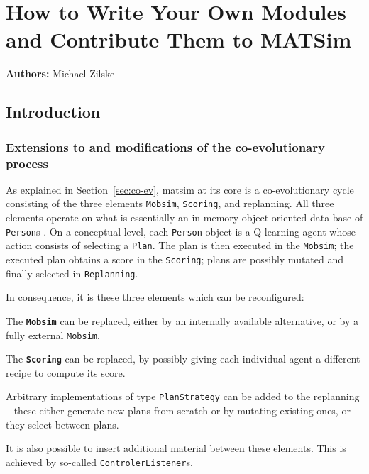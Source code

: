 \chapter{How to Write Your Own Modules and Contribute Them to MATSim}
\label{ch:extensionpoints}
\hfill \textbf{Authors:} Michael Zilske

\section{Introduction}
\label{sec:ownmodules-intro}

\subsection{Extensions to and modifications of the co-evolutionary process}

As explained in Section~\ref{sec:co-ev}, \acrshort{matsim} at its core is a co-evolutionary cycle consisting of the three elements \lstinline$Mobsim$, \lstinline$Scoring$, and replanning.  All three elements operate on what is essentially an in-memory object-oriented data base of \lstinline$Person$s \citep{RaneyNagel2006traf-framework}.  
%
On a conceptual level, each \lstinline$Person$ object is a Q-learning agent whose action consists of selecting a \lstinline$Plan$.  The plan is then executed in the \lstinline$Mobsim$; the executed plan obtains a score in the \lstinline$Scoring$; plans are possibly mutated and finally selected in \lstinline$Replanning$.

In consequence, it is these three elements which can be reconfigured:
\begin{compactitem}

\item The \textbf{\tt Mobsim} can be replaced, either by an internally available alternative, or by a fully external \lstinline$Mobsim$.


\item The \textbf{\tt Scoring} can be replaced, by possibly giving each individual agent a different recipe to compute its score.

\item Arbitrary implementations of type \lstinline$PlanStrategy$ can be added to the replanning -- these either generate new plans from scratch or by mutating existing ones, or they select between plans.

\end{compactitem}
It is also possible to insert additional material between these elements.  This is achieved by so-called \lstinline$ControlerListener$s.

